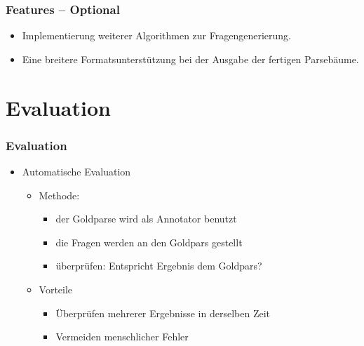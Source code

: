 \documentclass{beamer} %
\begin{document}
\begin{frame}
    \frametitle{Features – Optional}
    \begin{itemize}
        \item Implementierung weiterer Algorithmen zur Fragengenerierung.
        \item Eine breitere Formatsunterstützung bei der Ausgabe der fertigen Parsebäume.
    \end{itemize}
\end{frame}

\section{Evaluation}

\begin{frame}
    \frametitle{Evaluation}
    \begin{itemize}
        \item Automatische Evaluation
            \begin{itemize}
                \item Methode:
                    \begin{itemize}
                        \item der Goldparse wird als Annotator benutzt
                        \item die Fragen werden an den Goldpars gestellt
                        \item überprüfen: Entspricht Ergebnis dem Goldpars?
                    \end{itemize}
                \item Vorteile
                    \begin{itemize}
                        \item Überprüfen mehrerer Ergebnisse in derselben Zeit
                        \item Vermeiden menschlicher Fehler
                    \end{itemize}
            \end{itemize}
    \end{itemize}
\end{frame}
\end{document}
